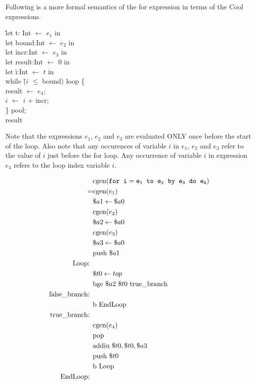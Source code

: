 \documentclass[10pt]{article}
\begin{document}
\begin{enumerate}
Following is a more formal semantics of the for expression in terms of the Cool
expressions.
\begin{tabbing}
  \hspace*{3mm} \= let t: Int $\leftarrow$ $e_1$ in \\
  \> let bound:Int  $\leftarrow$ $e_2$ in \\
  \> let incr:Int  $\leftarrow$ $e_3$ in \\
  \> let result:Int  $\leftarrow$ $0$ in \\
  \> let \= i:Int $\leftarrow$ $t$ in   \\
   \>  \> while \= ($i$ $\leq$ bound) loop \{ \\
     \>\>\>   result $\leftarrow$ $e_4$; \\
\> \> \> $i$ $\leftarrow$ $i$ + incr; \\
     \> \> \} pool; \\
     \> \> result  \\
\end{tabbing}

Note that the expressions $e_1$, $e_2$ and $e_3$ are evaluated ONLY once before the start of the loop.
Also note that any occurences of variable $i$ in $e_1$, $e_2$ and
$e_3$ refer to the value of $i$
just before the for loop.
Any occurrence of variable $i$ in expression $e_4$ refers to the loop index variable $i$.


\begin{equation}\begin{aligned}
	  & \text{cgen}(\tt{for}\;\; i = e_1 \;\;to\;\; e_2 \;\;\tt{by}\;\; e_3 \;\;\tt{do }\;\; e_4) \\
	= & \text{cgen} (e_1) 		\\
	  & \$a1 \leftarrow \$a0	\\
	  & \text{cgen} (e_2) 		\\
	  & \$a2 \leftarrow \$a0	\\
	  & \text{cgen} (e_3) 		\\
	  & \$a3 \leftarrow \$a0	\\
	  & \text{push } \$a1 		\\
	\text{Loop: } \\
	  & \$t0 \leftarrow top 	\\
	  & \text{bge } \$a2 \text{ } \$t0 \text{ true\_branch} \\
	\text{false\_branch: }  \\
	  & \text{b EndLoop}		\\
	\text{true\_branch: }	\\
	  & \text{cgen} (e_4) 		\\
	  & \text{pop} 				\\
	  & \text{addiu } \$t0, \$t0, \$a3 	\\
	  & \text{push } \$t0 		\\
	  & \text{b Loop} 			\\
	\text{EndLoop: } 		\\
\end{aligned}\end{equation}


\end{enumerate}
\end{document}
